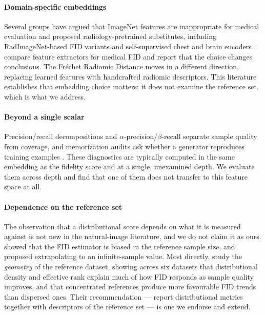 \documentclass[preprint,12pt,authoryear]{elsarticle}
\begin{document}
\paragraph{Domain-specific embeddings}
Several groups have argued that ImageNet features are inappropriate for medical
evaluation and proposed radiology-pretrained substitutes, including
RadImageNet-based FID variants \citep{dohmen2025similarity} and self-supervised
chest and brain encoders \citep{perezrad}. \citet{woodland2024feature}
compare feature extractors for medical FID and report that the choice changes
conclusions. The Fr\'echet Radiomic Distance \citep{konz2025frd} moves in a
different direction, replacing learned features with handcrafted radiomic
descriptors. This literature establishes that embedding choice matters; it does
not examine the reference set, which is what we address.

\paragraph{Beyond a single scalar}
Precision/recall decompositions \citep{sajjadi2018assessing,
kynkaanniemi2019pr} and $\alpha$-precision/$\beta$-recall
\citep{alaa2022faithful} separate sample quality from coverage, and
memorization audits ask whether a generator reproduces training examples
\citep{carlini2023extracting, akbar2025beware}. These diagnostics are typically
computed in the same embedding as the fidelity score and at a single, unexamined
depth. We evaluate them across depth and find that one of them does not
transfer to this feature space at all.

\paragraph{Dependence on the reference set}
The observation that a distributional score depends on what it is measured
against is not new in the natural-image literature, and we do not claim it as
ours. \citet{chong2020effectively} showed that the FID estimator is biased in
the reference sample size, and proposed extrapolating to an infinite-sample
value. Most directly, \citet{lee2026rethinking} study the \emph{geometry} of
the reference dataset, showing across six datasets that distributional density
and effective rank explain much of how FID responds as sample quality improves,
and that concentrated references produce more favourable FID trends than
dispersed ones. Their recommendation --- report distributional metrics together
with descriptors of the reference set --- is one we endorse and extend.
\end{document}
